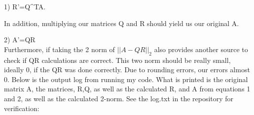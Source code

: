 \documentclass[12pt]{article}
\begin{document}
1) R'=Q^{T}A.

In addition, multiplying our matrices Q and R should yield us our original A. 

2) A'=QR
\\
Furthermore, if taking the 2 norm of $||A-QR||_{2}$ also provides another source to check if QR calculations are correct. This two norm should be really small, ideally 0, if the QR was done correctly. Due to rounding errors, our errors almost 0. Below is the output log from running my code. What is printed is the original matrix A, the matrices, R,Q, as well as the calculated R, and A from equations 1 and 2, as well as the calculated 2-norm. See the log.txt in the repository for verification:



\end{document}
